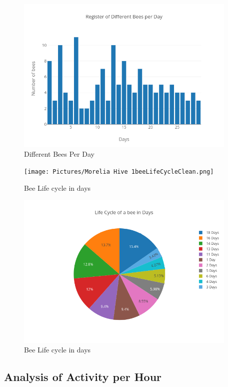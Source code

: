 \documentclass[11pt,fleqn]{book} %
\begin{document}
\begin{figure}[h!]%
\centering%
\includegraphics[width=400px]{Pictures/Morelia Hive 1differentBeesPerdayClean.png}%
\caption{Different Bees Per Day}%
\end{figure}

%


\begin{figure}[h!]%
\centering%
\texttt{[image: Pictures/Morelia Hive 1beeLifeCycleClean.png]}%
\caption{Bee Life cycle in days}%
\end{figure}

%


\begin{figure}[h!]%
\centering%
\includegraphics[width=400px]{Pictures/Morelia Hive 1pieBeeLifeCycleClean.png}%
\caption{Bee Life cycle in days}%
\end{figure}

%
\subsection{Analysis of Activity per Hour}%
\label{subsec:Analysis of Activity per Hour}%
\end{document}
